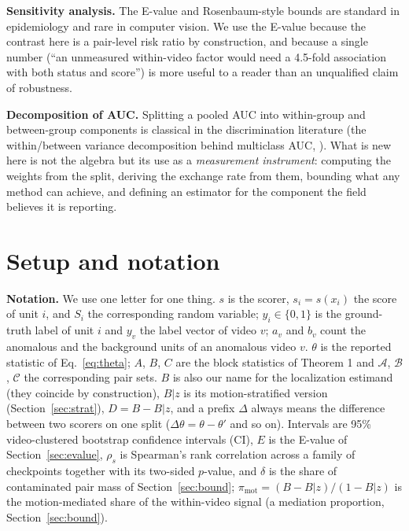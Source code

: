 \documentclass[number,preprint,12pt]{elsarticle}
\begin{document}
\textbf{Sensitivity analysis.} The E-value \citep{vanderweele2017sensitivity} and Rosenbaum-style bounds
\citep{rosenbaum1987sensitivity} are standard in epidemiology and rare
in computer vision. We use the E-value because the contrast here is a pair-level
risk ratio by construction, and because a single number (``an unmeasured
within-video factor would need a 4.5-fold association with both status and
score'') is more useful to a reader than an unqualified claim of robustness.

\textbf{Decomposition of AUC.} Splitting a pooled AUC into within-group and
between-group components is classical in the discrimination literature (the
within/between variance decomposition behind multiclass AUC, \citep{hand2001simple}).
What is new here is not the algebra but its use as a \emph{measurement instrument}:
computing the weights from the split, deriving the exchange rate from them,
bounding what any method can achieve, and defining an estimator for the component
the field believes it is reporting.

\section{Setup and notation}\label{sec:setup}

\textbf{Notation.} We use one letter for one thing. \(s\) is the scorer, \(s_i=s(x_i)\)
the score of unit \(i\), and \(S_i\) the corresponding random variable; \(y_i\in\{0,1\}\)
is the ground-truth label of unit \(i\) and \(y_v\) the label vector of video \(v\);
\(a_v\) and \(b_v\) count the anomalous and the background units of an anomalous video
\(v\). \(\theta\) is the reported statistic of Eq.~\eqref{eq:theta}; \(A\), \(B\), \(C\) are
the block statistics of Theorem 1 and \(\mathcal{A}\), \(\mathcal{B}\), \(\mathcal{C}\)
the corresponding pair sets. \(B\) is also our name for the localization estimand
(they coincide by construction), \(B|z\) is its motion-stratified version
(Section~\ref{sec:strat}), \(D=B-B|z\), and a prefix \(\Delta\) always means the
difference between two scorers on one split (\(\Delta\theta=\theta-\theta'\) and so
on). Intervals are 95\% video-clustered bootstrap confidence intervals (CI), \(E\)
is the E-value of Section~\ref{sec:evalue}, \(\rho_s\) is Spearman's rank
correlation across a family of checkpoints together with its two-sided \(p\)-value,
and \(\delta\) is the share of contaminated pair mass of Section~\ref{sec:bound};
\(\pi_{\mathrm{mot}}=(B-B|z)/(1-B|z)\) is the motion-mediated share of the
within-video signal (a mediation proportion, Section~\ref{sec:bound}).
\end{document}
